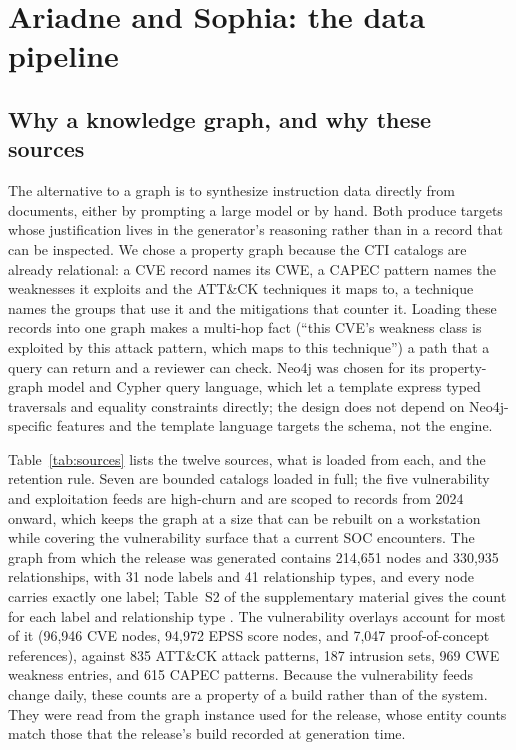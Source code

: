 \documentclass[a4paper,fleqn]{cas-dc}
\begin{document}
\section{Ariadne and Sophia: the data pipeline}\label{sec:data}
\subsection{Why a knowledge graph, and why these sources}
The alternative to a graph is to synthesize instruction data directly from documents, either by prompting a large model or by hand. Both produce targets whose justification lives in the generator's reasoning rather than in a record that can be inspected. We chose a property graph because the CTI catalogs are already relational: a CVE record names its CWE, a CAPEC pattern names the weaknesses it exploits and the ATT\&CK techniques it maps to, a technique names the groups that use it and the mitigations that counter it. Loading these records into one graph makes a multi-hop fact (``this CVE's weakness class is exploited by this attack pattern, which maps to this technique'') a path that a query can return and a reviewer can check. Neo4j was chosen for its property-graph model and Cypher query language, which let a template express typed traversals and equality constraints directly; the design does not depend on Neo4j-specific features and the template language targets the schema, not the engine.

Table~\ref{tab:sources} lists the twelve sources, what is loaded from each, and the retention rule. Seven are bounded catalogs loaded in full; the five vulnerability and exploitation feeds are high-churn and are scoped to records from 2024 onward, which keeps the graph at a size that can be rebuilt on a workstation while covering the vulnerability surface that a current SOC encounters. The graph from which the release was generated contains 214,651 nodes and 330,935 relationships, with 31 node labels and 41 relationship types, and every node carries exactly one label; Table~S2 of the supplementary material gives the count for each label and relationship type \citep{strom2018mitre,mitreCWE,mitreCAPEC,mitreCVE}. The vulnerability overlays account for most of it (96,946 CVE nodes, 94,972 EPSS score nodes, and 7,047 proof-of-concept references), against 835 ATT\&CK attack patterns, 187 intrusion sets, 969 CWE weakness entries, and 615 CAPEC patterns. Because the vulnerability feeds change daily, these counts are a property of a build rather than of the system. They were read from the graph instance used for the release, whose entity counts match those that the release's build recorded at generation time.
\end{document}
